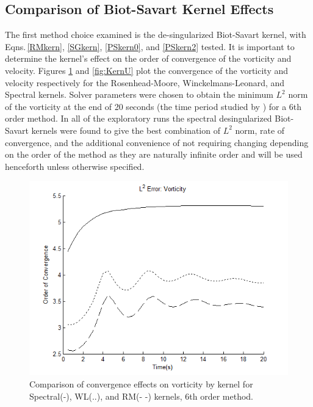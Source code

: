 \documentclass[letterpaper,12pt]{report}
\begin{document}
\subsection{Comparison of Biot-Savart Kernel Effects}\label{Pkern}
The first method choice examined is the de-singularized Biot-Savart kernel, with Eqns.\,\eqref{RMkern}, \eqref{SGkern}, \eqref{PSkern0}, and \eqref{PSkern2} tested. It is important to determine the kernel's effect on the order of convergence of the vorticity and velocity. Figures \ref{fig:KernW} and \ref{fig:KernU} plot the convergence of the vorticity and velocity respectively for the Rosenhead-Moore, Winckelmans-Leonard, and Spectral kernels. Solver parameters were chosen to obtain the minimum $L^2$ norm of the vorticity at the end of 20 seconds (the time period studied by \cite{Perlmann1985}) for a 6th order method. In all of the exploratory runs the spectral desingularized Biot-Savart kernels were found to give the best combination of $L^2$ norm, rate of convergence, and the additional convenience of not requiring changing depending on the order of the method as they are naturally infinite order and will be used henceforth unless otherwise specified.
\begin{figure}
\centering
\includegraphics[width=1\textwidth]{KernW.PNG}
\caption{\label{fig:KernW}Comparison of convergence effects on vorticity by kernel for Spectral(-), WL(..), and RM(- -) kernels, 6th order method.}
\end{figure}
\end{document}
